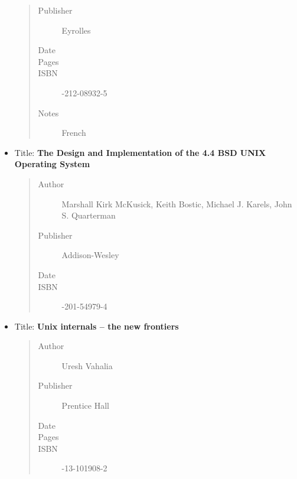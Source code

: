 \documentclass[a4paper,8pt,english]{sphinxmanual}
\begin{document}
\begin{itemize}
\begin{quote}
\begin{description}
\item[{Publisher}] \leavevmode
Eyrolles

\item[{Date}] 

\item[{Pages}] 

\item[{ISBN}] -212-08932-5

\item[{Notes}] \leavevmode
French

\end{description}\end{quote}

\item {} 
Title: \textbf{The Design and Implementation of the 4.4 BSD UNIX Operating System}
\begin{quote}\begin{description}
\item[{Author}] \leavevmode
Marshall Kirk McKusick, Keith Bostic, Michael J. Karels,
John S. Quarterman

\item[{Publisher}] \leavevmode
Addison-Wesley

\item[{Date}] 

\item[{ISBN}] -201-54979-4

\end{description}\end{quote}

\item {} 
Title: \textbf{Unix internals -- the new frontiers}
\begin{quote}\begin{description}
\item[{Author}] \leavevmode
Uresh Vahalia

\item[{Publisher}] \leavevmode
Prentice Hall

\item[{Date}] 

\item[{Pages}] 

\item[{ISBN}] -13-101908-2

\end{description}\end{quote}


\end{itemize}
\end{document}
